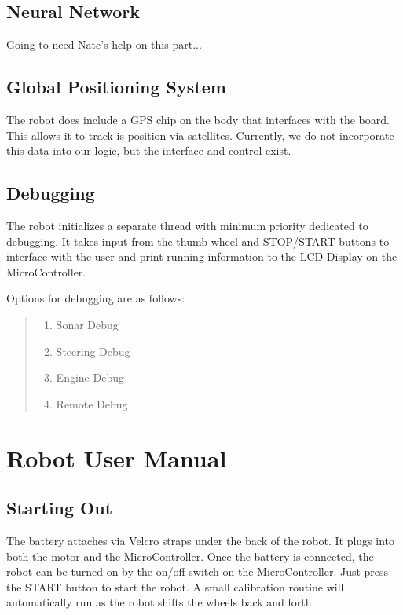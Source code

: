 \documentclass[12pt]{article}
\begin{document}
\clearpage
\subsection{Neural Network}
{\color{red} Going to need Nate's help on this part...}

\clearpage
\subsection{Global Positioning System}
The robot does include a GPS chip on the body that interfaces with the board.  This allows it to track is position via satellites.  Currently, we do not incorporate this data into our logic, but the interface and control exist.

\clearpage
\subsection{Debugging}
The robot initializes a separate thread with minimum priority dedicated to debugging.  It takes input from the thumb wheel and STOP/START buttons to interface with the user and print running information to the LCD Display on the MicroController.

Options for debugging are as follows:
\begin{quote}
\begin{enumerate}
\item Sonar Debug
\item Steering Debug
\item Engine Debug
\item Remote Debug
\end{enumerate}
\end{quote}





\clearpage
\section{Robot User Manual}
\subsection{Starting Out}
The battery attaches via Velcro straps under the back of the robot.  It plugs into both the motor and the MicroController.  Once the battery is connected, the robot can be turned on by the on/off switch on the MicroController.
\vspace{2mm}
Just press the START button to start the robot.  A small calibration routine will automatically run as the robot shifts the wheels back and forth.
\end{document}
